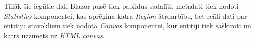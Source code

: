 Tālāk šie iegūtie dati Blazor pusē tiek papildus sadalīti: metadati tiek nodoti
\emph{Statistics} komponentei, kas aprēķina katra \emph{Region} ātrdarbību, bet
reāli dati par entītiju stāvokļiem tiek nodota \emph{Canvas} komponentei, kur
entītiji tiek sašķiroti un katrs uzzīmēts uz \emph{HTML canvas}.
